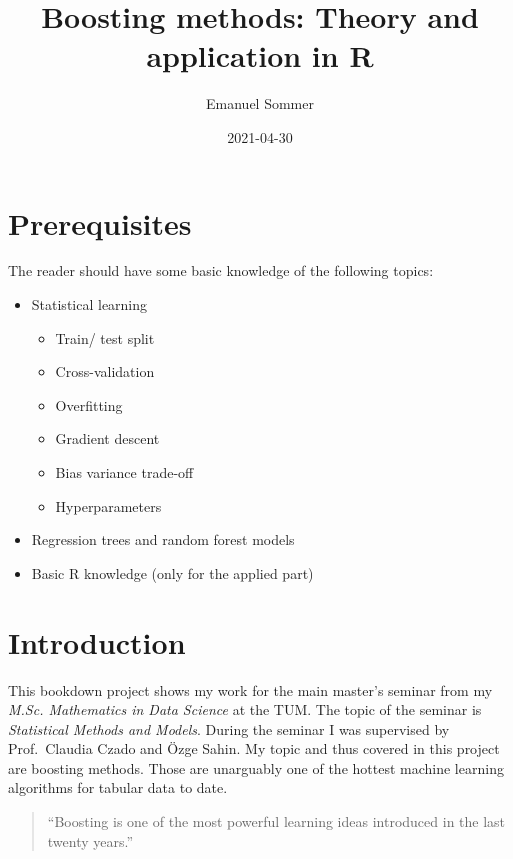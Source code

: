 \documentclass[
]{book}
\title{Boosting methods: Theory and application in R}
\author{Emanuel Sommer}
\date{2021-04-30}
\begin{document}
\maketitle

{
\setcounter{tocdepth}{1}
\tableofcontents
}
\hypertarget{prerequisites}{%
\chapter{Prerequisites}\label{prerequisites}}

The reader should have some basic knowledge of the following topics:

\begin{itemize}
\item
  Statistical learning

  \begin{itemize}
  \item
    Train/ test split
  \item
    Cross-validation
  \item
    Overfitting
  \item
    Gradient descent
  \item
    Bias variance trade-off
  \item
    Hyperparameters
  \end{itemize}
\item
  Regression trees and random forest models
\item
  Basic R knowledge (only for the applied part)
\end{itemize}

\hypertarget{intro}{%
\chapter{Introduction}\label{intro}}

This bookdown project shows my work for the main master's seminar from my \emph{M.Sc. Mathematics in Data Science} at the TUM. The topic of the seminar is \emph{Statistical Methods and Models}. During the seminar I was supervised by Prof.~Claudia Czado and Özge Sahin. My topic and thus covered in this project are boosting methods. Those are unarguably one of the hottest machine learning algorithms for tabular data to date.

\begin{quote}
``Boosting is one of the most powerful learning ideas introduced in the last
twenty years.'' \citep{elements}
\end{quote}
\end{document}
